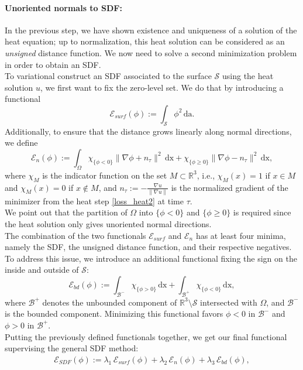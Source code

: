 \documentclass[draft,12pt,openany]{book}
\newcommand{\R}{\mathbb{R}}
\def\S{\mathcal{S}}
\theoremstyle{plainnormal}
\theoremstyle{remark}
\begin{document}
\paragraph{Unoriented normals to SDF:}
In the previous step, we have shown existence and uniqueness of a solution of the heat equation; up to normalization, this heat solution can be considered as an \emph{unsigned} distance function. We now need to solve a second minimization problem in order to obtain an SDF.\\
To variational construct an SDF associated to the surface $\mathcal{S}$ using the heat solution $u$, we first want to fix the zero-level set. We do that by introducing a functional $$\mathcal{E}_{surf}(\phi) := \int_\mathcal{S} \phi^2 \,\mathrm{da}.$$
Additionally, to ensure that the distance grows linearly along normal directions, we define $$\mathcal{E}_{n}(\phi) := \int_\Omega \chi_{\{\phi < 0\}} \|\nabla \phi + n_\tau\|^2 \,\mathrm{dx} + \chi_{\{\phi \geq 0\}} \|\nabla \phi - n_\tau\|^2 \,\mathrm{dx},$$
where $\chi_M$ is the indicator function on the set $M\subset \R^3$, i.e., $\chi_M(x) = 1$ if $x\in M$ and $\chi_M(x) = 0$ if $x\notin M$, and  $n_\tau := - \frac{\nabla u}{\|\nabla u\|}$ is the normalized gradient of the minimizer from the heat step \eqref{loss_heat2} at time $\tau$.\\ 
We point out that the partition of $\Omega$ into $\{\phi < 0\}$ and $\{\phi \geq 0\}$ is required since the heat solution only gives unoriented normal directions.\\
The combination of the two functionals $\mathcal E_{surf}$ and $\mathcal E_{n}$ has at least four minima, namely the SDF, the unsigned distance function, and their respective negatives. To address this issue, we introduce an additional functional fixing the sign on the inside and outside of $\S$: 
$$\mathcal{E}_{bd}(\phi) := \int_{\mathcal{B^-}} \chi_{\{\phi > 0\}} \,\mathrm{dx} + \int_{\mathcal{B^+}}\chi_{\{\phi < 0\}} \,\mathrm{dx},$$
where $\mathcal{B}^+$ denotes the unbounded component of $\R^3\setminus\S$ intersected with $\Omega$, and $\mathcal{B}^-$ is the bounded component. Minimizing this functional favors $\phi < 0$ in $\mathcal B^-$ and $\phi> 0$ in $\mathcal B^+$.\\
Putting the previously defined functionals together, we get our final functional supervising the general SDF method:
\begin{align}\label{E_SDF}
    \mathcal{E}_{SDF}(\phi) := \lambda_1\,\mathcal{E}_{surf} (\phi)+ \lambda_2\,\mathcal{E}_{n}(\phi) + \lambda_3\,\mathcal{E}_{bd}(\phi),
\end{align}
\end{document}
